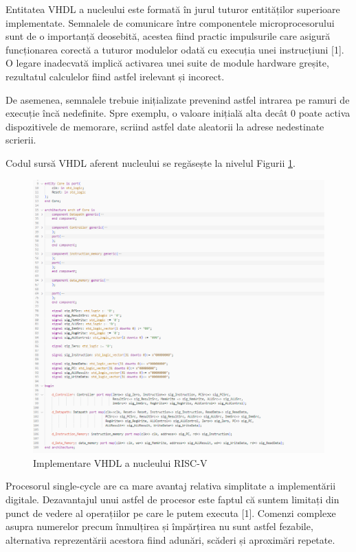 \documentclass[12pt]{article}
\begin{document}
Entitatea VHDL a nucleului este formată în jurul tuturor entităților superioare implementate. Semnalele de comunicare între componentele microprocesorului sunt de o importanță deosebită, acestea fiind practic impulsurile care asigură funcționarea corectă a tuturor modulelor odată cu execuția unei instrucțiuni [1]. O legare inadecvată implică activarea unei suite de module hardware greșite, rezultatul calculelor fiind astfel irelevant și incorect.
 
De asemenea, semnalele trebuie inițializate prevenind astfel intrarea pe ramuri de execuție încă nedefinite. Spre exemplu, o valoare inițială alta decât 0 poate activa dispozitivele de memorare, scriind astfel date aleatorii la adrese nedestinate scrierii.

Codul sursă VHDL aferent nucleului se regăsește la nivelul Figurii \ref{Figura:53}.
\newpage
  \begin{figure}[h!]
 \includegraphics[width=1.0\textwidth]{riscvcore.png}
 \centering
 \caption{Implementare VHDL a nucleului RISC-V}
 \label{Figura:53}
 \end{figure}
 
 
Procesorul single-cycle are ca mare avantaj relativa simplitate a implementării digitale.  Dezavantajul unui astfel de procesor este faptul că suntem limitați din punct de vedere al operațiilor pe care le putem executa [1]. Comenzi complexe asupra numerelor precum înmulțirea și împărțirea nu sunt astfel fezabile, alternativa reprezentării acestora fiind adunări, scăderi și aproximări repetate.
\end{document}
